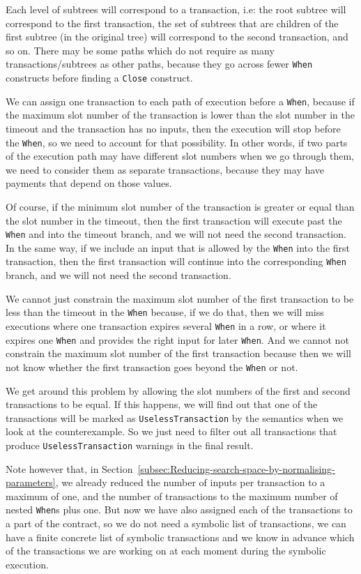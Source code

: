 \documentclass[english,runningheads]{llncs}
\begin{document}
Each level of subtrees will correspond to a transaction, i.e: the
root subtree will correspond to the first transaction, the set of
subtrees that are children of the first subtree (in the original tree)
will correspond to the second transaction, and so on. There may be
some paths which do not require as many transactions/subtrees as other
paths, because they go across fewer \texttt{When} constructs before
finding a \texttt{Close} construct.

We can assign one transaction to each path of execution before a \texttt{When},
because if the maximum slot number of the transaction is lower than
the slot number in the timeout and the transaction has no inputs,
then the execution will stop before the \texttt{When}, so we need
to account for that possibility. In other words, if two parts of the
execution path may have different slot numbers when we go through
them, we need to consider them as separate transactions, because they
may have payments that depend on those values.

Of course, if the minimum slot number of the transaction is greater
or equal than the slot number in the timeout, then the first transaction
will execute past the \texttt{When} and into the timeout branch, and
we will not need the second transaction. In the same way, if we include
an input that is allowed by the \texttt{When} into the first transaction,
then the first transaction will continue into the corresponding \texttt{When}
branch, and we will not need the second transaction.

We cannot just constrain the maximum slot number of the first transaction
to be less than the timeout in the \texttt{When} because, if we do
that, then we will miss executions where one transaction expires several
\texttt{When} in a row, or where it expires one \texttt{When} and provides
the right input for later \texttt{When}. And we cannot not constrain
the maximum slot number of the first transaction because then we will
not know whether the first transaction goes beyond the \texttt{When}
or not.

We get around this problem by allowing the slot numbers of the first
and second transactions to be equal. If this happens, we will find
out that one of the transactions will be marked as \texttt{UselessTransaction}
by the semantics when we look at the counterexample. So we just need
to filter out all transactions that produce \texttt{UselessTransaction}
warnings in the final result.

Note however that, in Section~\ref{subsec:Reducing-search-space-by-normalising-parameters},
we already reduced the number of inputs per transaction to a maximum
of one, and the number of transactions to the maximum number of nested
\texttt{When}s plus one. But now we have also assigned each of the
transactions to a part of the contract, so we do not need a symbolic
list of transactions, we can have a finite concrete list of symbolic
transactions and we know in advance which of the transactions we are
working on at each moment during the symbolic execution.
\end{document}
